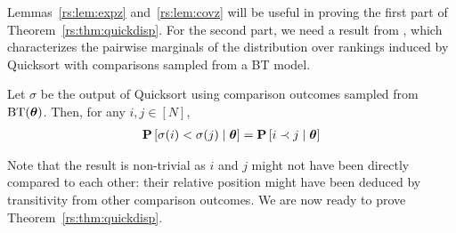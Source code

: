 Lemmas~\ref{rs:lem:expz} and~\ref{rs:lem:covz} will be useful in proving the first part of Theorem~\ref{rs:thm:quickdisp}.
For the second part, we need a result from \citet{ailon2008reconciling}, which characterizes the pairwise marginals of the distribution over rankings induced by Quicksort with comparisons sampled from a BT model.

\begin{theorem}
\label{rs:thm:stability}
Let $\sigma$ be the output of Quicksort using comparison outcomes sampled from $\operatorname{BT}(\bm{\theta})$.
Then, for any $i, j \in [N]$,
\begin{align*}
\mathbf{P}\left[ \sigma(i) < \sigma(j) \mid \bm{\theta} \right] = \mathbf{P}\left[ i \prec j \mid \bm{\theta} \right]
\end{align*}
\end{theorem}

Note that the result is non-trivial as $i$ and $j$ might not have been directly compared to each other: their relative position might have been deduced by transitivity from other comparison outcomes.
We are now ready to prove Theorem~\ref{rs:thm:quickdisp}.

